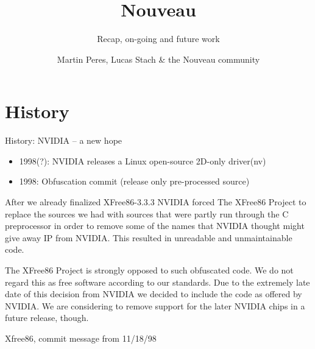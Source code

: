 \documentclass[11pt,english,compress]{beamer}
\title{Nouveau}
\subtitle{Recap, on-going and future work}
\author{Martin Peres, Lucas Stach \& the Nouveau community}
\institute{Ph.D. student at LaBRI, B.Eng. student at HfTL}
\begin{document}

\begin{frame}
	\titlepage
\end{frame}

\section{History}
	\begin{frame}
		\begin{block}{History: NVIDIA -- a new hope}
			\begin{itemize}
				\item 1998(?): NVIDIA releases a Linux open-source 2D-only driver(nv)
				\item 1998: Obfuscation commit (release only pre-processed source)
			\end{itemize}
		\end{block}
	\end{frame}

	\begin{frame}
		\begin{block}{}
			After we already finalized XFree86-3.3.3 NVIDIA forced The XFree86 Project
			to replace the sources we had with sources that were partly run through the
			C preprocessor in order to remove some of the names that NVIDIA thought
			might give away IP from NVIDIA. This resulted in unreadable and unmaintainable
			code.
		\end{block}

		\begin{block}{}
			The XFree86 Project is strongly opposed to such obfuscated code. We do not
			regard this as free software according to our standards. Due to the extremely
			late date of this decision from NVIDIA we decided to include the code as
			offered by NVIDIA. We are considering to remove support for the later NVIDIA
			chips in a future release, though.
		\end{block}

		 Xfree86, commit message from 11/18/98
	\end{frame}
\end{document}
